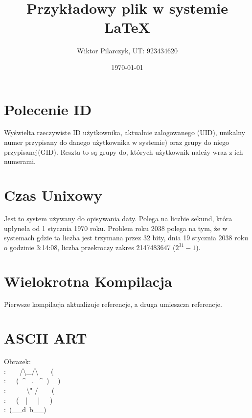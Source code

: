 \documentclass[a4paper]{article}
\author{Wiktor Pilarczyk, UT: 923434620}
\title{Przykładowy plik w systemie \LaTeX}
\date{\today}
\begin{document}
\maketitle
\section{Polecenie ID}
Wyświelta rzeczywiste ID użytkownika, aktualnie zalogowanego (UID), unikalny numer przypisany do danego użytkownika w systemie) oraz  grupy do niego przypisanej(GID). Reszta to są grupy do, których użytkownik należy wraz z ich numerami.
\section{Czas Unixowy}
Jest to system używany do opisywania daty. Polega na liczbie sekund, która upłyneła od 1 stycznia 1970 roku. Problem roku 2038 polega na tym, że w systemach gdzie ta liczba jest trzymana przez 32 bity, dnia 19 stycznia 2038 roku o godzinie 3:14:08, liczba przekroczy zakres 2147483647 ($2^{31}-1$).
\section{Wielokrotna Kompilacja}
Pierwsze kompilacja aktualizuje referencje, a druga umieszcza referencje.
\section{ASCII ART}
Obrazek:\\
:~~~~\slash\textbackslash\_\slash\textbackslash ~~~ (\\
:~~~(~\^ ~.~ \^~)~\_)\\
:~~~~~~\textbackslash " \slash ~~~~(\\
:~~~(~~|~~~|~~~)\\
:~(\_\_d~b\_\_)\\
\end{document}
